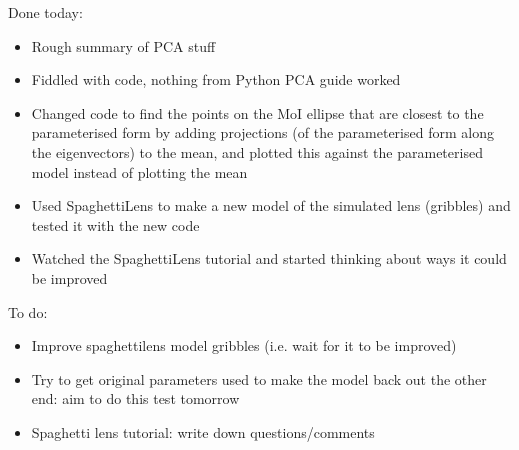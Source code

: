 \documentclass{article}
\begin{document}
\noindent Done today:
\begin{itemize}
  \item Rough summary of PCA stuff
  \item Fiddled with code, nothing from Python PCA guide worked
  \item Changed code to find the points on the MoI ellipse that are closest to the parameterised form by adding projections (of the parameterised form along the eigenvectors) to the mean, and plotted this against the parameterised model instead of plotting the mean
  \item Used SpaghettiLens to make a new model of the simulated lens (gribbles) and tested it with the new code
  \item Watched the SpaghettiLens tutorial and started thinking about ways it could be improved
\end{itemize}

\noindent To do:
\begin{itemize}
  \item Improve spaghettilens model gribbles (i.e. wait for it to be improved)
  \item Try to get original parameters used to make the model back out the other end: aim to do this test tomorrow
  \item Spaghetti lens tutorial: write down questions/comments
\end{itemize}
\end{document}
